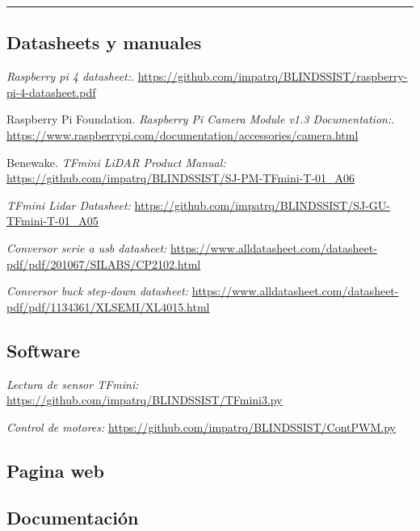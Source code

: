 \documentclass[12pt,a4paper]{article}
\newcommand{\separador}{\vspace{0.5cm}\noindent\rule{\linewidth}{0.5pt}\vspace{0.5cm}}
\begin{document}
\separador


\begin{thebibliography}{9}

\subsection{Datasheets y manuales}

\emph{Raspberry pi 4 datasheet:}. \href{https://github.com/impatrq/BLINDSSIST/blob/main/Hardware/raspberry-pi-4-datasheet.pdf}{https://github.com/impatrq/BLINDSSIST/raspberry-pi-4-datasheet.pdf}

Raspberry Pi Foundation. 
\emph{Raspberry Pi Camera Module v1.3 Documentation:}. \href{https://www.raspberrypi.com/documentation/accessories/camera.html}{https://www.raspberrypi.com/documentation/accessories/camera.html}

Benewake. 
\emph{TFmini LiDAR Product Manual:} \href{https://github.com/impatrq/BLINDSSIST/blob/main/Hardware/TFmini/SJ-PM-TFmini-T-01_A06%20Product%20Manual_EN.pdf}{https://github.com/impatrq/BLINDSSIST/SJ-PM-TFmini-T-01_A06}

\emph{TFmini Lidar Datasheet:}
\href{https://github.com/impatrq/BLINDSSIST/blob/main/Hardware/TFmini/SJ-GU-TFmini-T-01_A05%20Datasheet.pdf}{https://github.com/impatrq/BLINDSSIST/SJ-GU-TFmini-T-01_A05}

\emph{Conversor serie a usb datasheet:}
\href{https://www.alldatasheet.com/datasheet-pdf/pdf/201067/SILABS/CP2102.html}{https://www.alldatasheet.com/datasheet-pdf/pdf/201067/SILABS/CP2102.html}

\emph{Conversor buck step-down datasheet:}
\href{https://www.alldatasheet.com/datasheet-pdf/pdf/1134361/XLSEMI/XL4015.html}{https://www.alldatasheet.com/datasheet-pdf/pdf/1134361/XLSEMI/XL4015.html}

\subsection{Software}

\emph{Lectura de sensor TFmini:}
\href{https://github.com/impatrq/BLINDSSIST/blob/main/firmware/TFmini3.py}{https://github.com/impatrq/BLINDSSIST/TFmini3.py}

\emph{Control de motores:}
\href{https://github.com/impatrq/BLINDSSIST/blob/main/firmware/TFmini/ContPWM.py}{https://github.com/impatrq/BLINDSSIST/ContPWM.py}

\subsection{Pagina web}

\subsection{Documentación}



\end{thebibliography}
\end{document}
